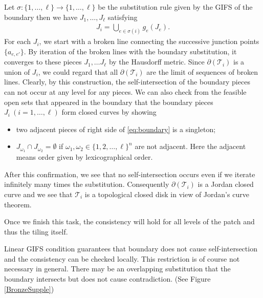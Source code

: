 \documentclass[a4]{amsart}
\theoremstyle{definition}
\begin{document}
Let $\sigma:\{1,\dots,\ell\}\to\{1,\dots,\ell\}$ be the substitution rule given by the GIFS of the boundary then we have $J_1,\dots,J_{\ell}$ satisfying
\begin{align}\label{eq:boundary}
J_i=\bigcup_{e\in \sigma(i)} g_e(J_e).
\end{align}
For each $J_i$, we start with a broken line connecting the successive junction points $\{a_{e,e'}\}$. By iteration of the broken lines with the boundary substitution, it converges to
these pieces $J_1,\dots J_{\ell}$ by the Hausdorff metric. Since $\partial(\mathcal{T}_i)$ is a union of $J_i$, we could regard that all $\partial(\mathcal{T}_i)$ are the limit of sequences of broken lines. Clearly, by this construction, the self-intersection of the boundary pieces can not occur at any level for any pieces. We can also check from the feasible open sets that appeared in the boundary that the boundary
pieces $J_i\ (i=1,\dots,\ell)$ 
form closed curves by showing
\begin{itemize}
    \item two adjacent pieces of right side of \eqref{eq:boundary} is a singleton;
    \item $J_{\omega_1}\cap J_{\omega_2}=\emptyset$ if $\omega_1,\omega_2\in \{1,2,\dots,\ell\}^n$ are not adjacent. 
Here the adjacent means order given by lexicographical order.
\end{itemize}
After this confirmation, we see that no self-intersection occurs even if we iterate infinitely many times the substitution. 
Consequently $\partial(\mathcal{T}_i)$ is a Jordan closed curve and we see
that $\mathcal{T}_i$ is a topological closed disk in view of Jordan's curve theorem.


Once we finish this task, the consistency will hold for all levels of
the patch and thus the tiling itself. 

Linear GIFS condition guarantees that boundary does not cause self-intersection and the consistency can be checked locally. This restriction is of course not necessary in general. There may be an overlapping substitution that the boundary
intersects but does not cause contradiction. (See Figure \ref{BronzeSupple})
\end{document}
